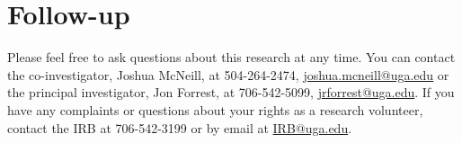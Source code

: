 \documentclass{article}
\begin{document}
    \section{Follow-up}
      Please feel free to ask questions about this research at any time.
      You can contact the co-investigator, Joshua McNeill, at 504-264-2474, \href{mailto:joshua.mcneill@uga.edu}{joshua.mcneill@uga.edu} or the principal investigator, Jon Forrest, at 706-542-5099, \href{mailto:jrforrest@uga.edu}{jrforrest@uga.edu}.
      If you have any complaints or questions about your rights as a research volunteer, contact the IRB at 706-542-3199 or by email at \href{mailto:IRB@uga.edu}{IRB@uga.edu}.
  
\end{document}
